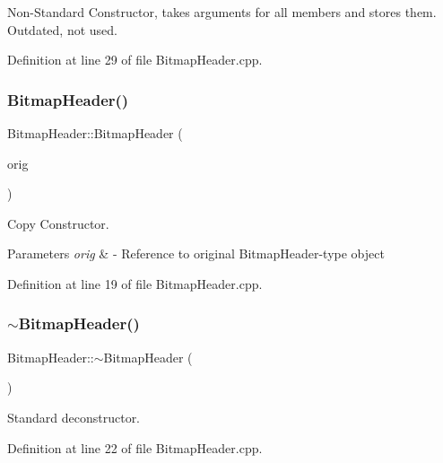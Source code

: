 Non-\/\+Standard Constructor, takes arguments for all members and stores them. Outdated, not used. 



Definition at line 29 of file Bitmap\+Header.\+cpp.

\mbox{\label{classBitmapHeader_a25a5481f49d70a8c42a9efc17f17fd48}} 
\subsubsection{\texorpdfstring{BitmapHeader()}{BitmapHeader()}\hspace{0.1cm}{\footnotesize\ttfamily [4/4]}}
{\footnotesize\ttfamily Bitmap\+Header\+::\+Bitmap\+Header (\begin{DoxyParamCaption}\item[{const \mbox{\hyperlink{classBitmapHeader}{Bitmap\+Header}} \&}]{orig }\end{DoxyParamCaption})}



Copy Constructor. 


\begin{DoxyParams}{Parameters}
{\em orig} & -\/ Reference to original Bitmap\+Header-\/type object \\
\hline
\end{DoxyParams}


Definition at line 19 of file Bitmap\+Header.\+cpp.

\mbox{\label{classBitmapHeader_a4e102d5fe9a8619fca7319b148ec23d1}} 
\subsubsection{\texorpdfstring{$\sim$BitmapHeader()}{~BitmapHeader()}}
{\footnotesize\ttfamily Bitmap\+Header\+::$\sim$\+Bitmap\+Header (\begin{DoxyParamCaption}{ }\end{DoxyParamCaption})\hspace{0.3cm}{\ttfamily [virtual]}}

Standard deconstructor. 

Definition at line 22 of file Bitmap\+Header.\+cpp.



